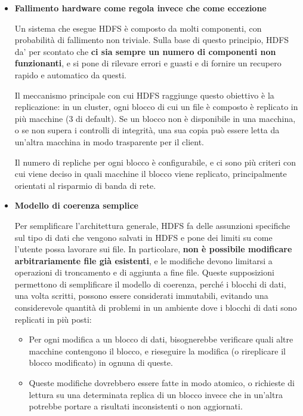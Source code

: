 \documentclass[italian,a4paper, twoside, 12pt]{report}
\begin{document}
\begin{itemize}
\item
  \textbf{Fallimento hardware come regola invece che come eccezione}

  Un sistema che esegue HDFS è composto da molti componenti, con
  probabilità di fallimento non triviale. Sulla base di questo
  principio, HDFS da' per scontato che \textbf{ci sia sempre un numero
  di componenti non funzionanti}, e si pone di rilevare errori e guasti
  e di fornire un recupero rapido e automatico da questi.

  Il meccanismo principale con cui HDFS raggiunge questo obiettivo è la
  replicazione: in un cluster, ogni blocco di cui un file è composto è
  replicato in più macchine (3 di default). Se un blocco non è
  disponibile in una macchina, o se non supera i controlli di integrità,
  una sua copia può essere letta da un'altra macchina in modo
  trasparente per il client.

  Il numero di repliche per ogni blocco è configurabile, e ci sono più
  criteri con cui viene deciso in quali macchine il blocco viene
  replicato, principalmente orientati al risparmio di banda di rete.
\item
  \textbf{Modello di coerenza semplice}

  Per semplificare l'architettura generale, HDFS fa delle assunzioni
  specifiche sul tipo di dati che vengono salvati in HDFS e pone dei
  limiti su come l'utente possa lavorare sui file. In particolare,
  \textbf{non è possibile modificare arbitrariamente file già
  esistenti}, e le modifiche devono limitarsi a operazioni di
  troncamento e di aggiunta a fine file. Queste supposizioni permettono
  di semplificare il modello di coerenza, perché i blocchi di dati, una
  volta scritti, possono essere considerati immutabili, evitando una
  considerevole quantità di problemi in un ambiente dove i blocchi di
  dati sono replicati in più posti:

  \begin{itemize}
  \item
    Per ogni modifica a un blocco di dati, bisognerebbe verificare quali
    altre macchine contengono il blocco, e rieseguire la modifica (o
    rireplicare il blocco modificato) in ognuna di queste.
  \item
    Queste modifiche dovrebbero essere fatte in modo atomico, o
    richieste di lettura su una determinata replica di un blocco invece
    che in un'altra potrebbe portare a risultati inconsistenti o non
    aggiornati.
  \end{itemize}


\end{itemize}
\end{document}
